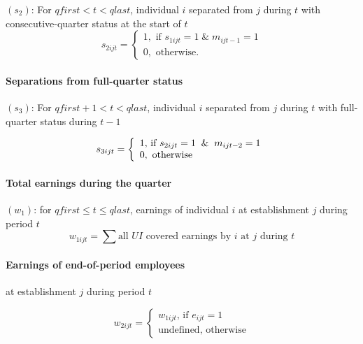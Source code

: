 $\left( s_{2}\right) $: For $qfirst<t<qlast$, individual $i$ separated from $%
j$ during $t$ with consecutive-quarter status at the start of $t$%
\begin{equation}
s_{2ijt}=\left\{ 
\begin{array}{l}
1,\text{ if }s_{1ijt}=1\;\&\;m_{ijt-1}=1 \\ 
0,\text{ otherwise.}%
\end{array}%
\right.  \label{eq:s2ijt}
\end{equation}

\paragraph{Separations from full-quarter status}

$\left( s_{3}\right) $: For $qfirst+1<t<qlast$, individual $i$ separated
from $j$ during $t$ with full-quarter status during $t-1$

\begin{equation}
s_{3ijt}=\left\{ 
\begin{array}{l}
{1\mbox{, if }s_{2ijt} = 1\And m_{ijt - 2} = 1} \\ 
{0,\mbox{ otherwise}}%
\end{array}%
\right.  \label{eq:s3ijt}
\end{equation}

\paragraph{Total earnings during the quarter}

$\left( w_{1}\right) $: for $qfirst\leq t\leq qlast$, earnings of individual 
$i$ at establishment $j$ during period $t$%
\begin{equation}
w_{1ijt}=\sum {\mbox{all }UI\mbox{ covered earnings by }i\mbox{ at 
}j\mbox{ during }t}
\end{equation}

\paragraph{Earnings of end-of-period employees}

at establishment $j$ during period $t$

\begin{equation}
w_{2ijt} = \left\{ 
\begin{array}{l}
{w_{1ijt} \mbox{, if }e_{ijt} = 1} \\ 
{\mbox{undefined, otherwise}}%
\end{array}%
\right.
\end{equation}

